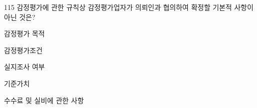 \begin{question}{115}
감정평가에 관한 규칙상 감정평가업자가 의뢰인과 협의하여 확정할 기본적 사항이 아닌 것은?
\begin{choices}
  \item 감정평가 목적
  \item 감정평가조건
  \item 실지조사 여부
  \item 기준가치
  \item 수수료 및 실비에 관한 사항
\end{choices}
\end{question}
